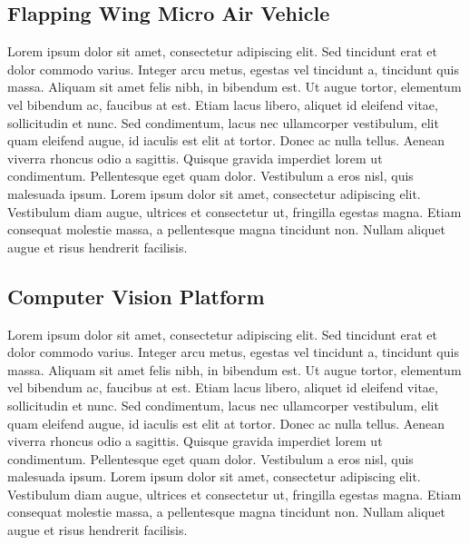 \documentclass[letterpaper, 10 pt, conference]{ieeeconf}
\begin{document}
\subsection{Flapping Wing Micro Air Vehicle}
Lorem ipsum dolor sit amet, consectetur adipiscing elit. Sed tincidunt erat et dolor commodo varius. Integer arcu metus, egestas vel tincidunt a, tincidunt quis massa. Aliquam sit amet felis nibh, in bibendum est. Ut augue tortor, elementum vel bibendum ac, faucibus at est. Etiam lacus libero, aliquet id eleifend vitae, sollicitudin et nunc. Sed condimentum, lacus nec ullamcorper vestibulum, elit quam eleifend augue, id iaculis est elit at tortor. Donec ac nulla tellus. Aenean viverra rhoncus odio a sagittis. Quisque gravida imperdiet lorem ut condimentum. Pellentesque eget quam dolor. Vestibulum a eros nisl, quis malesuada ipsum. Lorem ipsum dolor sit amet, consectetur adipiscing elit. Vestibulum diam augue, ultrices et consectetur ut, fringilla egestas magna. Etiam consequat molestie massa, a pellentesque magna tincidunt non. Nullam aliquet augue et risus hendrerit facilisis.

\subsection{Computer Vision Platform}
Lorem ipsum dolor sit amet, consectetur adipiscing elit. Sed tincidunt erat et dolor commodo varius. Integer arcu metus, egestas vel tincidunt a, tincidunt quis massa. Aliquam sit amet felis nibh, in bibendum est. Ut augue tortor, elementum vel bibendum ac, faucibus at est. Etiam lacus libero, aliquet id eleifend vitae, sollicitudin et nunc. Sed condimentum, lacus nec ullamcorper vestibulum, elit quam eleifend augue, id iaculis est elit at tortor. Donec ac nulla tellus. Aenean viverra rhoncus odio a sagittis. Quisque gravida imperdiet lorem ut condimentum. Pellentesque eget quam dolor. Vestibulum a eros nisl, quis malesuada ipsum. Lorem ipsum dolor sit amet, consectetur adipiscing elit. Vestibulum diam augue, ultrices et consectetur ut, fringilla egestas magna. Etiam consequat molestie massa, a pellentesque magna tincidunt non. Nullam aliquet augue et risus hendrerit facilisis.


\end{document}

